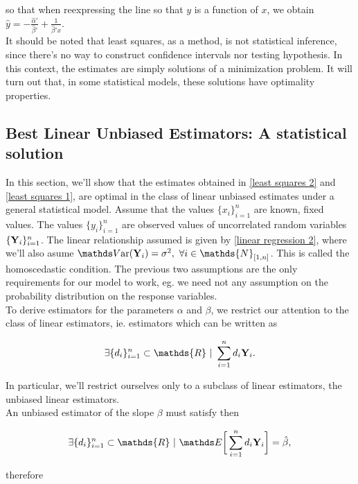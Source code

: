 \documentclass{homework}
\begin{document}
so that when reexpressing the line so that $y$ is a function of $x$, we obtain $\hat{y} = -\frac{\hat{\alpha}'}{\hat{\beta}'} + \frac{1}{\hat{\beta}' x}$. \\

It should be noted that least squares, as a method, is not statistical inference, since there's no way to construct confidence intervals nor testing hypothesis. In this context, the estimates are simply solutions of a minimization problem. It will turn out that, in some statistical models, these solutions have optimality properties. \\

\subsection{Best Linear Unbiased Estimators: A statistical solution}

In this section, we'll show that the estimates obtained in \eqref{least squares 2} and \eqref{least squares 1}, are optimal in the class of linear unbiased estimates under a general statistical model. Assume that the values $\{x_i\}_{i=1}^{n}$ are known, fixed values. The values $\{y_i\}_{i=1}^{n}$ are observed values of uncorrelated random variables $\{{\bf Y}_i\}_{i=1}^{n}$. The linear relationship assumed is given by \eqref{linear regression 2}, where we'll also asume $\var({\bf Y}_i) = \sigma^2, \blank \forall i \in \mathds{N}_{[1,n]}$. This is called the homoscedastic condition. The previous two assumptions are the only requirements for our model to work, eg. we need not any assumption on the probability distribution on the response variables. \\

To derive estimators for the parameters $\alpha$ and $\beta$, we restrict our attention to the class of linear estimators, ie. estimators which can be written as 

$$
\exists \{d_i\}_{i=1}^{n} \subset \mathds{R} \blank | \blank \sum_{i=1}^{n} d_i {\bf Y}_i.
$$

In particular, we'll restrict ourselves only to a subclass of linear estimators, the unbiased linear estimators. \\

An unbiased estimator of the slope $\beta$ must satisfy then 

$$
\exists \{d_i\}_{i=1}^{n} \subset \mathds{R} \blank | \blank  \E \bigg[\sum_{i=1}^{n} d_i {\bf Y}_i\bigg] = \hat{\beta},
$$

therefore 
\end{document}
